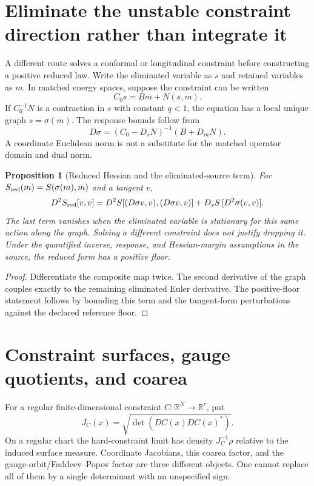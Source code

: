 \documentclass[11pt,a4paper,oneside]{book}
\theoremstyle{plain}
\newtheorem{proposition}[theorem]{Proposition}
\theoremstyle{definition}
\theoremstyle{remark}
\newcommand{\R}{\mathbb R}
\newcommand{\src}[2]{\cite{#1}}
\begin{document}
\section{Eliminate the unstable constraint direction rather than integrate it}
A different route solves a conformal or longitudinal constraint before constructing a positive reduced law. Write the eliminated variable as $s$ and retained variables as $m$. In matched energy spaces, suppose the constraint can be written
\begin{equation}
 C_0s=Bm+N(s,m).
 \label{eq:constraint-graph}
\end{equation}
If $C_0^{-1}N$ is a contraction in $s$ with constant $q<1$, the equation has a local unique graph $s=\sigma(m)$. The response bounds follow from
\begin{equation}
 D\sigma=(C_0-D_sN)^{-1}(B+D_mN).
 \label{eq:constraint-response}
\end{equation}
A coordinate Euclidean norm is not a substitute for the matched operator domain and dual norm. \cite{R9,R10}

\begin{proposition}[Reduced Hessian and the eliminated-source term]
\label{prop:reduced-hessian}
For $S_{\rm red}(m)=S(\sigma(m),m)$ and a tangent $v$,
\begin{equation}
 D^2S_{\rm red}[v,v]
 =D^2S[(D\sigma v,v),(D\sigma v,v)]
   +D_sS\,[D^2\sigma(v,v)].
 \label{eq:reduced-hessian}
\end{equation}
The last term vanishes when the eliminated variable is stationary for this same action along the graph. Solving a different constraint does not justify dropping it. Under the quantified inverse, response, and Hessian-margin assumptions in the source, the reduced form has a positive floor.
\end{proposition}
\begin{proof}
Differentiate the composite map twice. The second derivative of the graph couples exactly to the remaining eliminated Euler derivative. The positive-floor statement follows by bounding this term and the tangent-form perturbations against the declared reference floor.
\end{proof}
\cite{R10}

\section{Constraint surfaces, gauge quotients, and coarea}
For a regular finite-dimensional constraint $C:\R^N\to\R^r$, put
\begin{equation}
 J_C(x)=\sqrt{\det(DC(x)DC(x)^*)}.
\end{equation}
On a regular chart the hard-constraint limit has density $J_C^{-1}\rho$ relative to the induced surface measure. Coordinate Jacobians, this coarea factor, and the gauge-orbit/Faddeev--Popov factor are three different objects. One cannot replace all of them by a single determinant with an unspecified sign. \src{R10}{prop:v44-three-determinants}
\end{document}
